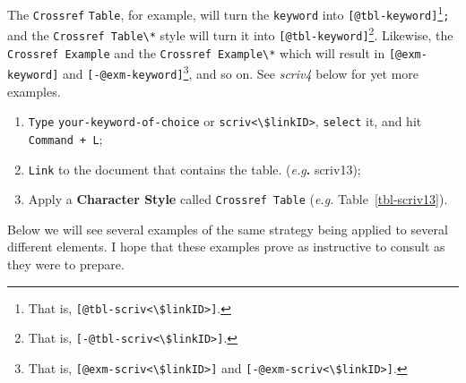 \documentclass[
  12pt,
  a4paper,
  oneside,
  titlepage,
  toclink=all,
  toc=bibliography]{scrbook}
\providecommand{\tightlist}{%
  \setlength{\itemsep}{0pt}\setlength{\parskip}{0pt}}\usepackage{longtable,booktabs,array}
\theoremstyle{definition}
\theoremstyle{plain}
\theoremstyle{plain}
\theoremstyle{plain}
\theoremstyle{plain}
\theoremstyle{definition}
\theoremstyle{definition}
\theoremstyle{plain}
\theoremstyle{remark}
\begin{document}
The \texttt{Crossref} \texttt{Table}, for example, will turn the
\texttt{keyword} into \texttt{{[}@tbl-keyword{]}}\footnote{That is,
  \texttt{{[}@tbl-scriv\textless{}\textbackslash{}\$linkID\textgreater{}{]}}.}\texttt{;}
and the \texttt{Crossref\ Table\textbackslash{}*} style will turn it
into \texttt{{[}@tbl-keyword{]}}\footnote{That is,
  \texttt{{[}-@tbl-scriv\textless{}\textbackslash{}\$linkID\textgreater{}{]}}.}.
{} Likewise, the
\texttt{Crossref\ Example} and the
\texttt{Crossref\ Example\textbackslash{}*} which will result in
\texttt{{[}@exm-keyword{]}} and \texttt{{[}-@exm-keyword{]}}\footnote{That
  is,
  \texttt{{[}@exm-scriv\textless{}\textbackslash{}\$linkID\textgreater{}{]}}
  and
  \texttt{{[}-@exm-scriv\textless{}\textbackslash{}\$linkID\textgreater{}{]}}.},
and so on. See \emph{scriv4} below for yet more examples.

\begin{tcolorbox}[enhanced jigsaw, left=2mm, colframe=quarto-callout-tip-color-frame, bottomtitle=1mm, colback=white, coltitle=black, title=\textcolor{quarto-callout-tip-color}{\faLightbulb}\hspace{0.5em}{Cross-referencing a table}, toprule=.15mm, rightrule=.15mm, opacityback=0, breakable, toptitle=1mm, titlerule=0mm, colbacktitle=quarto-callout-tip-color!10!white, arc=.35mm, bottomrule=.15mm, leftrule=.75mm, opacitybacktitle=0.6]

\begin{enumerate}
\def\labelenumi{\arabic{enumi}.}
\tightlist
\item
  \texttt{Type} \texttt{your-keyword-of-choice} or
  \texttt{scriv\textless{}\textbackslash{}\$linkID\textgreater{}},
  \texttt{select} it, and hit \texttt{Command\ +\ L};
\item
  \texttt{Link} to the document that contains the table.
  (\emph{e.g}\textbf{.} scriv13);
\item
  Apply a \textbf{Character Style} called \texttt{Crossref\ Table}
  (\emph{e.g.}
  \protect\hypertarget{cite_7}{}{\label{cite_7}Table~\ref{tbl-scriv13}}).
\end{enumerate}

\end{tcolorbox}

Below we will see several examples of the same strategy being applied to
several different elements. I hope that these examples prove as
instructive to consult as they were to prepare.
\end{document}
